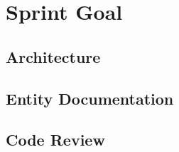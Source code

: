 \section{Sprint Goal}

\subsection{Architecture}


\subsection{Entity Documentation}

\subsection{Code Review}